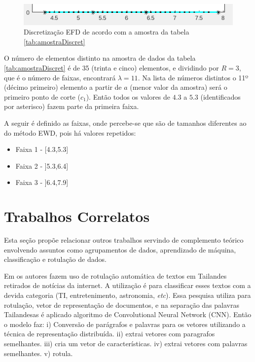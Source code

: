\begin{figure}[h] 
        \centering
        \includegraphics[scale=0.9]{figs/efd_fisheriris_col1.png}
        \caption{Discretização EFD de acordo com a amostra da tabela \ref{tab:amostraDiscret}}%
        \label{fig:faixasFihseririsExemploEFD}
\end{figure}

O número de elementos distinto na amostra de dados da tabela \ref{tab:amostraDiscret} é de 35 (trinta e cinco) elementos, e dividindo por ${R=3}$, que é o número de faixas, encontrará ${\lambda=11}$. Na lista de números distintos o 11º (décimo primeiro) elemento a partir de ${a}$ (menor valor da amostra) será o primeiro ponto de corte (${c_1}$). Então todos os valores de ${4.3}$ a ${5.3}$ (identificados por asterisco) fazem parte da primeira faixa.

A seguir é definido as faixas, onde percebe-se que são de tamanhos diferentes ao do método EWD, pois há valores repetidos:

\vspace{-3mm}
\begin{itemize}[noitemsep]
 \item Faixa 1 - [4.3,5.3]
 \item Faixa 2 - ]5.3,6.4]
 \item Faixa 3 - ]6.4,7.9]

\end{itemize}


 

\section{Trabalhos Correlatos}\label{cap:refTeor:sec:trabcorrel}

Esta seção propõe relacionar outros trabalhos servindo de complemento teórico envolvendo assuntos como agrupamentos de dados, aprendizado de máquina, classificação e rotulação de dados.

Em \cite{Jirasirilerd2018} os autores fazem uso de rotulação automática de textos em Tailandes retirados de notícias da internet. A utilização é para classificar esses textos com a devida categoria (TI, entretenimento, astronomia, \textit{etc}). Essa pesquisa utiliza para rotulação, vetor de representação de documentos, e na separação das palavras Tailandesas é aplicado algoritmo de Convolutional Neural Network (CNN). Então o modelo faz: i) Conversão de parágrafos e palavras para os vetores utilizando a técnica de representação distribuída. ii) extrai vetores com paragrafos semelhantes. iii) cria um vetor de características. iv) extrai vetores com palavras semelhantes. v) rotula.



